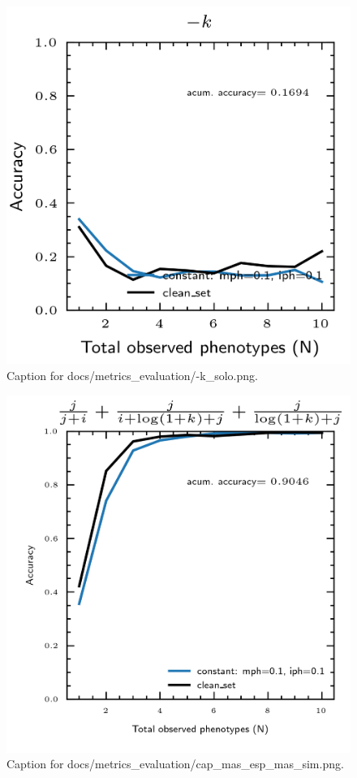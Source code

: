 \documentclass{article}
\begin{document}
\begin{figure}[h] \centering \includegraphics{docs/metrics_evaluation/-k_solo.png} \caption{Caption for docs/metrics_evaluation/-k_solo.png.} \end{figure}
\begin{figure}[h] \centering \includegraphics{docs/metrics_evaluation/cap_mas_esp_mas_sim.png} \caption{Caption for docs/metrics_evaluation/cap_mas_esp_mas_sim.png.} \end{figure}
\end{document}
